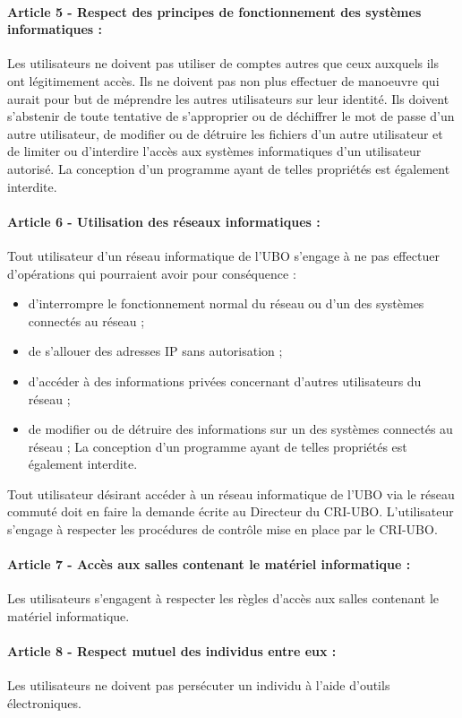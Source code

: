 \documentclass[11pt]{article}
\begin{document}
{{\begin{multicols*}{2}
\paragraph{Article 5 - Respect des principes de fonctionnement des systèmes informatiques :}
Les utilisateurs ne doivent pas utiliser de comptes autres que ceux auxquels ils ont légitimement accès. Ils ne doivent pas non plus effectuer de manoeuvre qui aurait pour but de méprendre les autres utilisateurs sur leur identité. Ils doivent s'abstenir de toute tentative de s'approprier ou de déchiffrer le mot de passe d'un autre utilisateur, de modifier ou de détruire les fichiers d'un autre utilisateur et de limiter ou d'interdire l'accès aux systèmes informatiques d'un utilisateur autorisé. La conception d'un programme ayant de telles propriétés est également interdite.
\paragraph{Article 6 - Utilisation des réseaux informatiques :} Tout utilisateur d'un réseau informatique de l'UBO s'engage à ne pas effectuer d'opérations qui pourraient avoir pour conséquence :
\begin{itemize}
\item d'interrompre le fonctionnement normal du réseau ou d'un des systèmes connectés au réseau ;
\item de s'allouer des adresses IP sans autorisation ;
\item d'accéder à des informations privées concernant d'autres utilisateurs du réseau ;
\item de modifier ou de détruire des informations sur un des systèmes connectés au réseau ;
La conception d'un programme ayant de telles propriétés est également interdite.
\end{itemize}

Tout utilisateur désirant accéder à un réseau informatique de l'UBO via le réseau commuté doit en faire la demande écrite au Directeur du CRI-UBO. L'utilisateur s'engage à respecter les procédures de contrôle mise en place par le CRI-UBO.

\paragraph{Article 7 - Accès aux salles contenant le matériel informatique :}
Les utilisateurs s'engagent à respecter les règles d'accès aux salles contenant le matériel informatique.

\paragraph{Article 8 - Respect mutuel des individus entre eux :}
Les utilisateurs ne doivent pas persécuter un individu à l'aide d'outils électroniques.


\end{multicols*}}}
\end{document}
